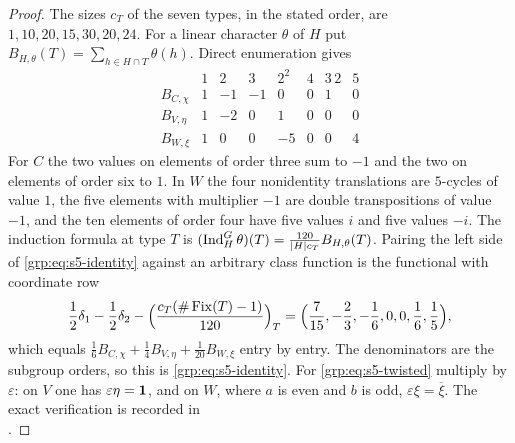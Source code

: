 \begin{proof}
The sizes $c_T$ of the seven types, in the stated order, are
$1,10,20,15,30,20,24$. For a linear character $\theta$ of $H$ put
$B_{H,\theta}(T)=\sum_{h\in H\cap T}\theta(h)$. Direct enumeration gives
\[
\begin{array}{c|rrrrrrr}
 &1&2&3&2^2&4&3\,2&5\\ \hline
B_{C,\chi}&1&-1&-1&0&0&1&0\\
B_{V,\eta}&1&-2&0&1&0&0&0\\
B_{W,\xi}&1&0&0&-5&0&0&4
\end{array}
\]
For $C$ the two values on elements of order three sum to $-1$ and the two on
elements of order six to $1$. In $W$ the four nonidentity translations are
$5$-cycles of value $1$, the five elements with multiplier $-1$ are double
transpositions of value $-1$, and the ten elements of order four have five
values $i$ and five values $-i$. The induction formula at type $T$ is
$(\operatorname{Ind}_H^G\theta)(T)=\frac{120}{\lvert H\rvert c_T}B_{H,\theta}(T)$. Pairing the left
side of \eqref{grp:eq:s5-identity} against an arbitrary class function is the
functional with coordinate row
\[
 \frac12\delta_1-\frac12\delta_2
 -\Bigl(\frac{c_T(\#\operatorname{Fix}(T)-1)}{120}\Bigr)_T
 =\Bigl(\frac7{15},-\frac23,-\frac16,0,0,\frac16,\frac15\Bigr),
\]
which equals $\frac16B_{C,\chi}+\frac14B_{V,\eta}+\frac1{20}B_{W,\xi}$ entry
by entry. The denominators are the subgroup orders, so this is
\eqref{grp:eq:s5-identity}. For \eqref{grp:eq:s5-twisted} multiply by
$\varepsilon$: on $V$ one has $\varepsilon\eta=\mathbf{1}$, and on $W$, where $a$
is even and $b$ is odd, $\varepsilon\xi=\overline\xi$. The exact verification
is recorded in\\
.
\end{proof}


